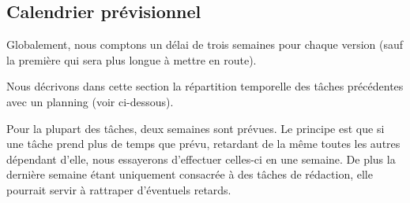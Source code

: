 \documentclass{article}
\begin{document}
\subsection{\label{calendrier}Calendrier prévisionnel}

Globalement, nous comptons un délai de trois semaines pour chaque version (sauf la première qui sera plus longue à mettre en route).

Nous décrivons dans cette section la répartition temporelle des tâches précédentes avec un planning (voir ci-dessous).

Pour la plupart des tâches, deux semaines sont prévues. Le principe est que si une tâche prend plus de temps que prévu, retardant de la même toutes les autres dépendant d'elle, nous essayerons d'effectuer celles-ci en une semaine. De plus la dernière semaine étant uniquement consacrée à des tâches de rédaction, elle pourrait servir à rattraper d'éventuels retards.

\newpage

\end{document}
